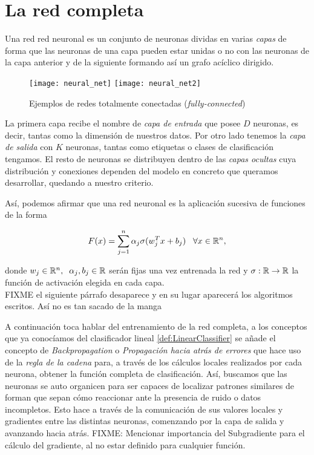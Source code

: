 \section{La red completa}

Una red red neuronal es un conjunto de neuronas dividas en varias \emph{capas} de forma que las neuronas de una capa pueden estar unidas o no con las neuronas de la capa anterior y de la siguiente formando así un grafo acíclico dirigido.\newline

\begin{figure}[htpb]
  \centering
  \texttt{[image: neural\_net]}
  \vrule
  \texttt{[image: neural\_net2]}
  \caption{Ejemplos de redes totalmente conectadas (\emph{fully-connected}) \stanford }
  \label{fig:fully-connected}
\end{figure}

La primera capa recibe el nombre de \emph{capa de entrada} que posee $D$ neuronas, es decir, tantas como la dimensión de nuestros datos. Por otro lado tenemos la \emph{capa de salida} con $K$ neuronas, tantas como etiquetas o clases de clasificación tengamos. El resto de neuronas se distribuyen dentro de las \emph{capas ocultas} cuya distribución y conexiones dependen del modelo en concreto que queramos desarrollar, quedando a nuestro criterio.\newline


Así, podemos afirmar que una red neuronal es la aplicación sucesiva de funciones de la forma

$$F(x)=\sum_{j=1}^n \alpha_j \sigma(w_j^Tx+b_j) \;\;\; \forall x \in \mathbb{R}^n,$$

donde $w_j\in\mathbb{R}^n,\;\; \alpha_j,b_j\in\mathbb{R}$ serán fijas una vez entrenada la red y $\sigma : \mathbb{R} \to \mathbb{R}$ la función de activación elegida en cada capa.\\

FIXME el siguiente párrafo desaparece y en su lugar aparecerá los algoritmos escritos. Así no es tan sacado de la manga

A continuación toca hablar del entrenamiento de la red completa, a los conceptos que ya conocíamos del clasificador lineal \ref{def:LinearClassifier} se añade el concepto de \emph{Backpropagation} o \emph{Propagación hacia atrás de errores} que hace uso de la \emph{regla de la cadena} para, a través de los cálculos locales realizados por cada neurona, obtener la función completa de clasificación. Así, buscamos que las neuronas se auto organicen para ser capaces de localizar patrones similares de forman que sepan cómo reaccionar ante la presencia de ruido o datos incompletos. Esto hace a través de la comunicación de sus valores locales y gradientes entre las distintas neuronas, comenzando por la capa de salida y avanzando hacia atrás. FIXME: Mencionar importancia del Subgradiente para el cálculo del gradiente, al no estar definido para cualquier función. \newline


